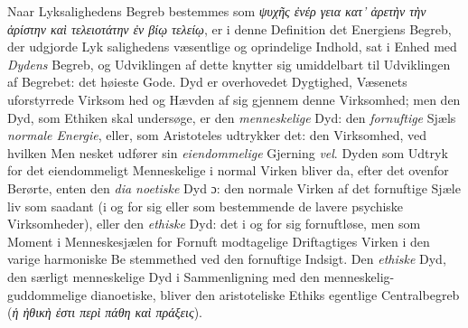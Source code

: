 \documentclass[12pt,a4paper]{book}
\newcommand{\gk}[1]{\textit{#1}}
\begin{document}
Naar Lyksalighedens Begreb bestemmes som \gk{ψυχῆς ἐνέρ\-%
γεια κατ' ἀρετὴν τὴν ἀρίστην καὶ τελειοτάτην ἐν βίῳ τελείῳ},
er i denne Definition det Energiens Begreb, der udgjorde Lyk\-%
salighedens væsentlige og oprindelige Indhold, sat i Enhed
med \emph{Dydens} Begreb, og Udviklingen af dette knytter sig
umiddelbart til Udviklingen af Begrebet: det høieste Gode.
Dyd er overhovedet Dygtighed, Væsenets uforstyrrede Virksom\-%
hed og Hævden af sig gjennem denne Virksomhed; men den
Dyd, som Ethiken skal undersøge, er den \emph{menneskelige}
Dyd: den \emph{fornuftige} Sjæls \emph{normale Energie}, eller, som
Aristoteles udtrykker det: den Virksomhed, ved hvilken Men\-%
nesket udfører sin \emph{eiendommelige} Gjerning \emph{vel}. Dyden
som Udtryk for det eiendommeligt Menneskelige i normal
Virken bliver da, efter det ovenfor Berørte, enten den \emph{dia\-%
noetiske} Dyd ɔ: den normale Virken af det fornuftige Sjæle\-%
liv som saadant (i og for sig eller som bestemmende de lavere
psychiske Virksomheder), eller den \emph{ethiske} Dyd: det i og for
sig fornuftløse, men som Moment i Menneskesjælen for Fornuft
modtagelige Driftagtiges Virken i den varige harmoniske Be\-%
stemmethed ved den fornuftige Indsigt. Den \emph{ethiske} Dyd,
den særligt menneskelige Dyd i Sammenligning med den
menneskelig-guddommelige dianoetiske, bliver den aristoteliske
Ethiks egentlige Centralbegreb (\gk{ἡ ἠθικὴ ἐστι περὶ πάθη καὶ
πράξεις}).
\end{document}
